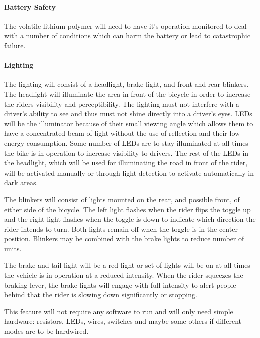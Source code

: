 \documentclass[12pt,article]{IEEEtran}
\begin{document}
        \paragraph{Battery Safety}
        	The volatile lithium polymer will need to have it's operation monitored to deal with a
        	number of conditions which can harm the battery or lead to catastrophic failure.

        \paragraph{Lighting}
        	The lighting will consist of a headlight, brake light, and front and rear blinkers. The 
        	headlight will illuminate the area in front of the bicycle in order to increase the riders 
        	visibility and perceptibility.  The lighting must not interfere with a driver's ability to 
        	see and thus must not shine directly into a driver's eyes.  LEDs will be the illuminator 
        	because of their small viewing angle which allows them to have a concentrated beam of light 
        	without the use of reflection and their low energy consumption.  Some number of LEDs are to
        	stay illuminated at all times the bike is in operation to increase visibility to drivers.  
        	The rest of the LEDs in the headlight, which will be used for  illuminating the road in 
        	front of the rider, will be activated manually or through light detection to activate 
        	automatically in dark areas.
        
        	The blinkers will consist of lights mounted on the rear, and possible front, of either side of 
        	the bicycle.  The left light flashes when the rider flips the toggle up and the right light 
        	flashes when the toggle is down to indicate which direction the rider intends to turn.  Both 
        	lights remain off when the toggle is in the center position.  Blinkers may be combined with the 
        	brake lights to reduce number of  units.
        	
        	The brake and tail light will be a red light or set of lights will be on at all times the 
        	vehicle is in operation at a reduced intensity.  When the rider squeezes the braking lever, 
        	the brake lights will engage with full intensity to alert people behind that the rider is 
        	slowing down significantly or stopping.
        	
        	This feature will not require any software to run and will only need simple hardware: resistors, 
        	LEDs, wires, switches and maybe some others if different modes are to be hardwired.  
      
\end{document}
